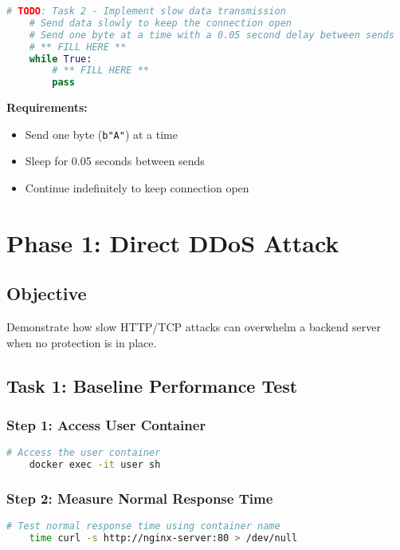 \documentclass[12pt]{article}
\begin{document}
    \begin{lstlisting}[language=python, caption=Attack Script - Task 2.2]
    # TODO: Task 2 - Implement slow data transmission
    # Send data slowly to keep the connection open
    # Send one byte at a time with a 0.05 second delay between sends
    # ** FILL HERE **
    while True:
        # ** FILL HERE **
        pass
    \end{lstlisting}

    \textbf{Requirements:}
    \begin{itemize}
        \item Send one byte (\texttt{b"A"}) at a time
        \item Sleep for 0.05 seconds between sends
        \item Continue indefinitely to keep connection open
    \end{itemize}

    \section{Phase 1: Direct DDoS Attack}

    \subsection{Objective}
    Demonstrate how slow HTTP/TCP attacks can overwhelm a backend server when no protection is in place.

    \subsection{Task 1: Baseline Performance Test}

    \subsubsection{Step 1: Access User Container}
    \begin{lstlisting}[language=bash]
    # Access the user container
    docker exec -it user sh
    \end{lstlisting}

    \subsubsection{Step 2: Measure Normal Response Time}
    \begin{lstlisting}[language=bash]
    # Test normal response time using container name
    time curl -s http://nginx-server:80 > /dev/null
    \end{lstlisting}
\end{document}
